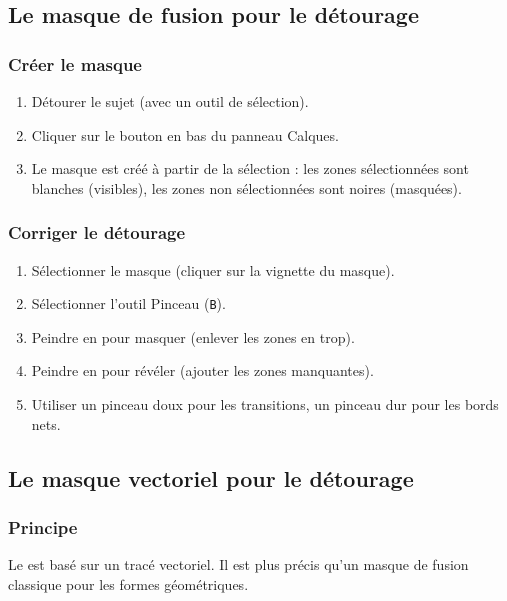\subsection{Le masque de fusion pour le détourage}

\subsubsection{Créer le masque}

\begin{enumerate}
    \item Détourer le sujet (avec un outil de sélection).
    \item Cliquer sur le bouton  en bas du panneau Calques.
    \item Le masque est créé à partir de la sélection : les zones sélectionnées sont blanches (visibles), les zones non sélectionnées sont noires (masquées).
\end{enumerate}

\subsubsection{Corriger le détourage}

\begin{enumerate}
    \item Sélectionner le masque (cliquer sur la vignette du masque).
    \item Sélectionner l'outil Pinceau (\texttt{B}).
    \item Peindre en  pour masquer (enlever les zones en trop).
    \item Peindre en  pour révéler (ajouter les zones manquantes).
    \item Utiliser un pinceau doux pour les transitions, un pinceau dur pour les bords nets.
\end{enumerate}

\subsection{Le masque vectoriel pour le détourage}

\subsubsection{Principe}

Le  est basé sur un tracé vectoriel. Il est plus précis qu'un masque de fusion classique pour les formes géométriques.

